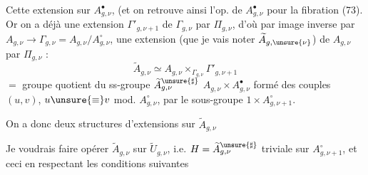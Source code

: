  Cette extension   sur \(A_{g,\nu}^{\bullet}\),  (et on retrouve ainsi l'op. de \(A_{g,\nu}^{\bullet}\) pour la fibration (73). Or on a déjà une extension \(\Gamma'_{g,\nu+1}\) de \(\Gamma_{g,\nu}\) par \(\Pi_{g,\nu}\), d'où par image inverse par \(A_{g,\nu}\to\Gamma_{g,\nu}=A_{g,\nu}/A_{g,\nu}^{\circ}\), une extension (que je vais noter \(\widetilde A_{g,\unsure{\nu}}\)) de \(A_{g,\nu}\) par \(\Pi_{g,\nu}\) :
\[
 \widetilde A_{g,\nu}\simeq A_{g,\nu}\mathbin{\times}_{\Gamma_{g,\nu}}\Gamma'_{g,\nu+1}
 \tag{74}
\]
\(=\) groupe quotient du ss-groupe  \(\widetilde A_{g,\nu}^{\unsure{\sharp}}\)  \(A_{g,\nu}\times A_{g,\nu}^{\bullet}\) formé des couples \((u,v)\), \(u\unsure{\equiv}v\)  mod. \(A_{g,\nu}^{\circ}\), par le sous-groupe  \(1\times A_{g,\nu+1}^{\circ}\).

On a donc deux  structures d'extensions sur \(\widetilde A_{g,\nu}\)



Je voudrais faire opérer \(\widetilde A_{g,\nu}\) sur \(\widetilde U_{g,\nu}\), i.e.  \(H=\widetilde A_{g,\nu}^{\unsure{\sharp}}\)   triviale sur \(A_{g,\nu+1}^{\circ}\), et ceci en respectant les conditions suivantes

